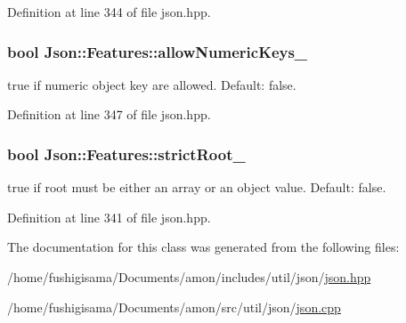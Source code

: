Definition at line 344 of file json.\-hpp.

\hypertarget{class_json_1_1_features_aff3cb16b79d15d3d761b11a0dd6d4d6b}{
\subsubsection[{allow\-Numeric\-Keys\-\_\-}]{\setlength{\rightskip}{0pt plus 5cm}bool Json\-::\-Features\-::allow\-Numeric\-Keys\-\_\-}}\label{class_json_1_1_features_aff3cb16b79d15d3d761b11a0dd6d4d6b}


{\ttfamily true} if numeric object key are allowed. Default\-: {\ttfamily false}. 



Definition at line 347 of file json.\-hpp.

\hypertarget{class_json_1_1_features_a1162c37a1458adc32582b585b552f9c3}{
\subsubsection[{strict\-Root\-\_\-}]{\setlength{\rightskip}{0pt plus 5cm}bool Json\-::\-Features\-::strict\-Root\-\_\-}}\label{class_json_1_1_features_a1162c37a1458adc32582b585b552f9c3}
{\ttfamily true} if root must be either an array or an object value. Default\-: {\ttfamily false}. 

Definition at line 341 of file json.\-hpp.



The documentation for this class was generated from the following files\-:\begin{DoxyCompactItemize}
\item 
/home/fushigisama/\-Documents/amon/includes/util/json/\hyperlink{json_8hpp}{json.\-hpp}\item 
/home/fushigisama/\-Documents/amon/src/util/json/\hyperlink{json_8cpp}{json.\-cpp}\end{DoxyCompactItemize}
